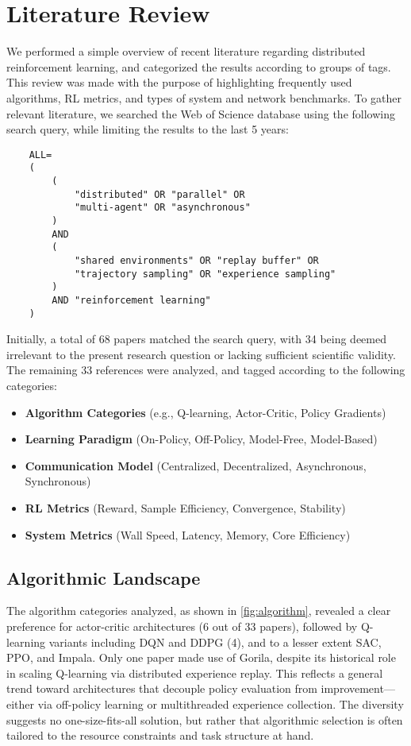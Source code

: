 \section{Literature Review}
\label{sec:literature_review}

We performed a simple overview of recent literature regarding distributed reinforcement learning,
and categorized the results according to groups of tags.
This review was made with the purpose of highlighting frequently used algorithms, RL metrics,
and types of system and network benchmarks.
To gather relevant literature, we searched the Web of Science database using the following search query,
while limiting the results to the last 5 years:

\begin{verbatim}
    ALL=
    (
        (
            "distributed" OR "parallel" OR
            "multi-agent" OR "asynchronous"
        )
        AND
        (
            "shared environments" OR "replay buffer" OR
            "trajectory sampling" OR "experience sampling"
        )
        AND "reinforcement learning"
    )
\end{verbatim}

Initially, a total of 68 papers matched the search query, with 34 being deemed irrelevant to the
present research question or lacking sufficient scientific validity.
The remaining 33 references were analyzed, and tagged according to the following categories:

\begin{itemize}[leftmargin=*, label={--}]
    \item \textbf{Algorithm Categories} (e.g., Q-learning, Actor-Critic, Policy Gradients)
    \item \textbf{Learning Paradigm} (On-Policy, Off-Policy, Model-Free, Model-Based)
    \item \textbf{Communication Model} (Centralized, Decentralized, Asynchronous, Synchronous)
    \item \textbf{RL Metrics} (Reward, Sample Efficiency, Convergence, Stability)
    \item \textbf{System Metrics} (Wall Speed, Latency, Memory, Core Efficiency)
\end{itemize}

\subsection{Algorithmic Landscape}

The algorithm categories analyzed, as shown in \cref{fig:algorithm}, revealed a clear preference for actor-critic architectures (6 out of 33 papers),
followed by Q-learning variants including DQN and DDPG (4), and to a lesser extent SAC, PPO, and Impala.
Only one paper made use of Gorila, despite its historical role in scaling Q-learning via distributed experience replay.
This reflects a general trend toward architectures that decouple policy evaluation from improvement—either via off-policy learning or multithreaded experience collection.
The diversity suggests no one-size-fits-all solution, but rather that algorithmic selection is often tailored to the resource constraints and task structure at hand.

